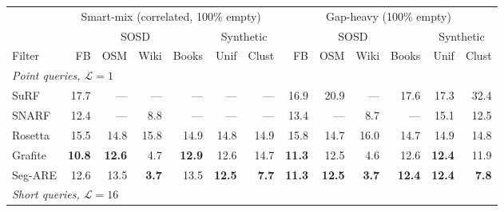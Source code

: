 \begin{table}[H]
    \centering
    \footnotesize
    \setlength{\tabcolsep}{4pt}
    \begin{tabular}{@{}lrrrrrr|rrrrrr@{}}
        \toprule
        & \multicolumn{6}{c|}{Smart-mix (correlated, 100\% empty)} & \multicolumn{6}{c}{Gap-heavy (100\% empty)} \\
        \cmidrule(lr){2-7} \cmidrule(lr){8-13}
        & \multicolumn{4}{c}{SOSD} & \multicolumn{2}{c|}{Synthetic} & \multicolumn{4}{c}{SOSD} & \multicolumn{2}{c}{Synthetic} \\
        \cmidrule(lr){2-5} \cmidrule(lr){6-7} \cmidrule(lr){8-11} \cmidrule(lr){12-13}
        Filter  & FB            & OSM              & Wiki             & Books            & Unif             & Clust            & FB            & OSM              & Wiki             & Books            & Unif          & Clust        \\
        \midrule
        \multicolumn{13}{l}{\textit{Point queries, $\mathcal{L} = 1$}} \\
        \midrule
        SuRF    & 17.7          & \textnormal{---} & \textnormal{---} & \textnormal{---} & \textnormal{---} & \textnormal{---} & 16.9          & 20.9             & \textnormal{---} & 17.6             & 17.3          & 32.4         \\
        SNARF   & 12.4          & \textnormal{---} & 8.8              & \textnormal{---} & \textnormal{---} & \textnormal{---} & 13.4          & \textnormal{---} & 8.7              & \textnormal{---} & 15.1          & 12.5         \\
        Rosetta & 15.5          & 14.8             & 15.8             & 14.9             & 14.8             & 14.9             & 15.8          & 14.7             & 16.0             & 14.7             & 14.9          & 14.8         \\
        Grafite & \textbf{10.8} & \textbf{12.6}    & 4.7              & \textbf{12.9}    & 12.6             & 14.7             & \textbf{11.3} & 12.5             & 4.6              & 12.6             & \textbf{12.4} & 11.9         \\
        Seg-ARE & 12.6          & 13.5             & \textbf{3.7}     & 13.5             & \textbf{12.5}    & \textbf{7.7}     & \textbf{11.3} & \textbf{12.5}    & \textbf{3.7}     & \textbf{12.4}    & \textbf{12.4} & \textbf{7.8} \\
        \midrule
        \multicolumn{13}{l}{\textit{Short queries, $\mathcal{L} = 16$}} \\

\end{tabular}
\end{table}
